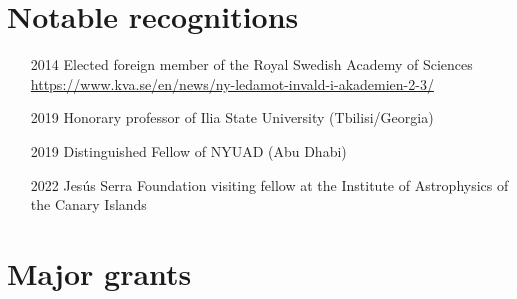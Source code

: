 \documentclass{article}
\begin{document}
\section*{Notable recognitions}

\begin{itemize}\itemsep-1pt
\item[2014]
Elected foreign member of the Royal Swedish Academy of Sciences\\
\url{https://www.kva.se/en/news/ny-ledamot-invald-i-akademien-2-3/}

\item[2019]
Honorary professor of Ilia State University (Tbilisi/Georgia)

\item[2019]
Distinguished Fellow of NYUAD (Abu Dhabi)

\item[2022]
Jes\'us Serra Foundation visiting fellow at the Institute of Astrophysics of the Canary Islands

\end{itemize}

\section*{Major grants}
\end{document}
